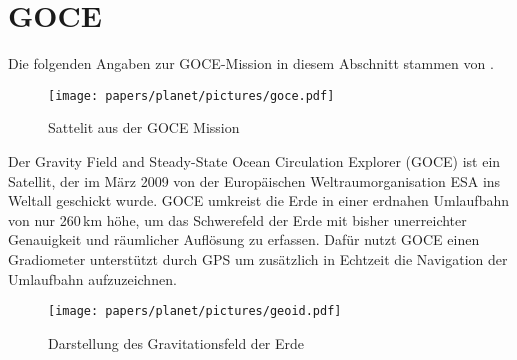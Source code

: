 %
%
%
%
\section{GOCE
\label{planet:section:goce}}

Die folgenden Angaben zur GOCE-Mission in diesem Abschnitt stammen von \cite{planet:goce}.

\begin{figure}[h]
    \centering
    \texttt{[image: papers/planet/pictures/goce.pdf]}
    \caption{Sattelit aus der GOCE Mission \cite{planet:gocepic}
        \label{planet:fig:goce}}
\end{figure}

Der Gravity Field and Steady-State Ocean Circulation Explorer (GOCE) ist ein Satellit, der im März 2009 von der Europäischen Weltraumorganisation ESA ins Weltall geschickt wurde.
GOCE umkreist die Erde in einer erdnahen Umlaufbahn von nur 260\,km höhe, um das Schwerefeld der Erde mit bisher unerreichter Genauigkeit und räumlicher Auflösung zu erfassen.
Dafür nutzt GOCE einen Gradiometer unterstützt durch GPS um zusätzlich in Echtzeit die Navigation der Umlaufbahn aufzuzeichnen.

\begin{figure}[h]
    \centering
    \texttt{[image: papers/planet/pictures/geoid.pdf]}
    \caption{Darstellung des Gravitationsfeld der Erde \cite{planet:geoidpic}
        \label{planet:fig:geoid}}
\end{figure}


